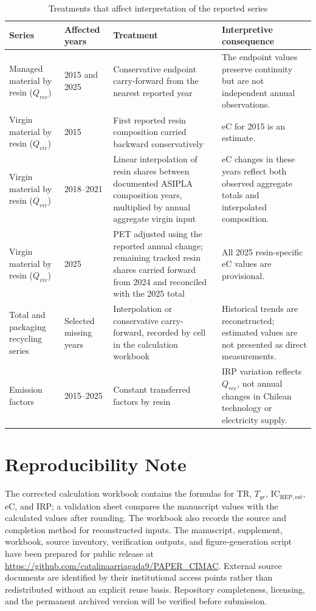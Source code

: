 \documentclass[review,10pt]{elsarticle}
\begin{document}
\begin{longtable}{|L{3.4cm}|L{2.4cm}|L{4.4cm}|L{5.0cm}|}
\caption{Treatments that affect interpretation of the reported series}
\label{tab:s_treatments}\\
\hline
\textbf{Series} & \textbf{Affected years} & \textbf{Treatment} & \textbf{Interpretive consequence} \\
\hline
\endfirsthead
\hline
Managed material by resin ($Q_{rec}$) & 2015 and 2025 & Conservative endpoint carry-forward from the nearest reported year & The endpoint values preserve continuity but are not independent annual observations. \\
\hline
Virgin material by resin ($Q_{vir}$) & 2015 & First reported resin composition carried backward conservatively & eC for 2015 is an estimate. \\
\hline
Virgin material by resin ($Q_{vir}$) & 2018--2021 & Linear interpolation of resin shares between documented ASIPLA composition years, multiplied by annual aggregate virgin input & eC changes in these years reflect both observed aggregate totals and interpolated composition. \\
\hline
Virgin material by resin ($Q_{vir}$) & 2025 & PET adjusted using the reported annual change; remaining tracked resin shares carried forward from 2024 and reconciled with the 2025 total & All 2025 resin-specific eC values are provisional. \\
\hline
Total and packaging recycling series & Selected missing years & Interpolation or conservative carry-forward, recorded by cell in the calculation workbook & Historical trends are reconstructed; estimated values are not presented as direct measurements. \\
\hline
Emission factors & 2015--2025 & Constant transferred factors by resin & IRP variation reflects $Q_{rec}$, not annual changes in Chilean technology or electricity supply. \\
\hline
\end{longtable}

\section{Reproducibility Note}

The corrected calculation workbook contains the formulas for TR, $T_{gr}$, IC$_{\mathrm{REP,est}}$, eC, and IRP; a validation sheet compares the manuscript values with the calculated values after rounding. The workbook also records the source and completion method for reconstructed inputs. The manuscript, supplement, workbook, source inventory, verification outputs, and figure-generation script have been prepared for public release at \url{https://github.com/catalinaarriagada9/PAPER_CIMAC}. External source documents are identified by their institutional access points rather than redistributed without an explicit reuse basis. Repository completeness, licensing, and the permanent archived version will be verified before submission.
\end{document}
